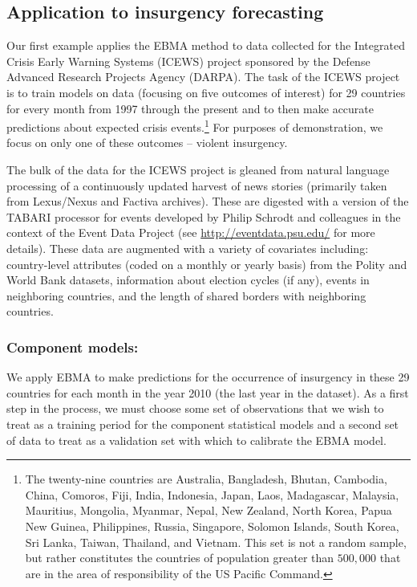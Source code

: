 \documentclass[12pt,fullpage,endnotes]{article}
\newcommand{\note}[1]{\footnote{ #1 \vspace{4 mm}}}
\begin{document}
\subsection{Application to insurgency forecasting}

Our first example applies the EBMA method to data collected for the
Integrated Crisis Early Warning Systems (ICEWS) project sponsored by
the Defense Advanced Research Projects Agency (DARPA).  The task of
the ICEWS project is to train models on data (focusing on five
outcomes of interest) for 29 countries for every month from 1997
through the present and to then make accurate predictions about
expected crisis events.\note{The twenty-nine countries are Australia,
  Bangladesh, Bhutan, Cambodia, China, Comoros, Fiji, India,
  Indonesia, Japan, Laos, Madagascar, Malaysia, Mauritius, Mongolia,
  Myanmar, Nepal, New Zealand, North Korea, Papua New Guinea,
  Philippines, Russia, Singapore, Solomon Islands, South Korea, Sri
  Lanka, Taiwan, Thailand, and Vietnam. This set is not a random
  sample, but rather constitutes the countries of population greater
  than $500,000$ that are in the area of responsibility of the US
  Pacific Command.}  For purposes of demonstration, we focus on only
one of these outcomes -- violent insurgency.

The bulk of the data for the ICEWS project is gleaned from natural
language processing of a continuously updated harvest of news stories
(primarily taken from Lexus/Nexus and Factiva archives). These are
digested with a version of the TABARI processor for events developed
by Philip Schrodt and colleagues in the context of the Event Data
Project (see \url{http://eventdata.psu.edu/} for more details).  These
data are augmented with a variety of covariates including:
country-level attributes (coded on a monthly or yearly basis) from the
Polity and World Bank datasets, information about election cycles (if
any), events in neighboring countries, and the length of shared
borders with neighboring countries.

\subsubsection{Component models:}

We apply EBMA to make predictions for the occurrence of insurgency in
these 29 countries for each month in the year 2010 (the last year in
the dataset). As a first step in the process, we must choose some set
of observations that we wish to treat as a training period for the
component statistical models and a second set of data to treat as a
validation set with which to calibrate the EBMA model.
\end{document}
